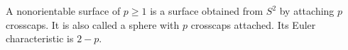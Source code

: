 A nonorientable surface of  $p \geqslant 1$ is a surface obtained from $S^2$ by attaching $p$ crosscaps. It is also called a sphere with $p$ crosscaps attached. Its Euler characteristic is $2 - p$.
